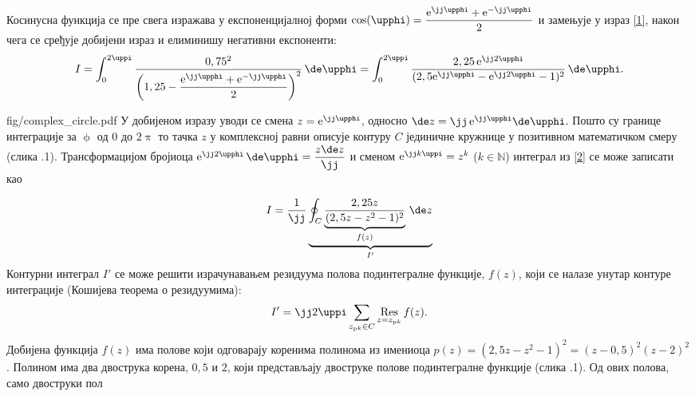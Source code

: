 Косинусна функција се пре свега изражава у 
експоненцијалној форми 
$\cos(\upphi) = \dfrac{{\rm e}^{\jj \upphi}
+ {\rm e}^{-\jj \upphi}}{2}$ и замењује 
у израз \eqref{1}, након чега се сређује добијени 
израз и елиминишу негативни експоненти:
\begin{equation}
I = \int_0^{2\uppi} 
\frac{0,75^2}{
\left(1,25 - 
\dfrac{{\rm e}^{\jj \upphi}
+ {\rm e}^{-\jj \upphi}}{2}
\right)^2
}
 \, \de \upphi 
 =
\int_0^{2\uppi} 
\dfrac{2,25 \, {\rm e}^{\jj 2 \upphi} }{
(
2,5 {\rm e}^{\jj \upphi}
- {\rm e}^{\jj 2 \upphi}
- 1
)^2
}
 \, \de \upphi.
 \label{2}
\end{equation} 
\begin{slikaDesno}{fig/complex_circle.pdf}
У добијеном изразу уводи се смена $z = {\rm e}^{\jj
\upphi}$, односно $\de z = 
\jj \, {\rm e}^{\jj
 \upphi} \de \upphi$. Пошто су границе интеграције 
 за $\upphi$ од 0 до $2\uppi$ то тачка $z$ у 
 комплексној равни описује контуру $C$ јединичне 
 кружнице у позитивном математичком смеру
 (слика \ID.1).
 Трансформацијом бројиоца 
 ${\rm e^{\jj 2 \upphi}} \, \de \upphi = 
 \dfrac{z \de z}{\jj}$ и сменом 
 ${\rm e}^{\jj k \uppi} = z^k$ ($k \in \mathbb N$)
 интеграл из \eqref{2} се може записати као 
\end{slikaDesno}
 \begin{equation}
 I = 
 \dfrac{1}{\jj}
\underbrace{  
 \oint_C 
	\underbrace{	
\dfrac{2,25 z }{
(
2,5 z
- z^2
- 1
)^2
}	
	}_{f(z)}
 \,\de z
 }_{I'} \label{3}
 \end{equation}
 Контурни интеграл $I'$ се може решити
 израчунавањем резидуума полова
 подинтегралне функције, $f(z)$, који се налазе унутар 
 контуре интеграције (Кошијева теорема о 
 резидуумима): 
 \begin{equation}
 I' = \jj 2 \uppi \sum_{z_{{\rm p}k} \in C} 
 \underset{z = z_{{\rm p}k}}{\operatorname{Res}}\,
 f(z). \label{5}
 \end{equation}
 Добијена функција $f(z)$ има полове који одговарају
 коренима полинома из имениоца 
 $p(z) = 
(
2,5 z
- z^2
- 1
)^2
= (z-0,5)^2(z - 2)^2
$.
Полином има два двострука корена, 
$0,5$ и $2$, који представљају двоструке полове 
подинтегралне функције (слика \ID.1). Од ових полова, само двоструки пол
